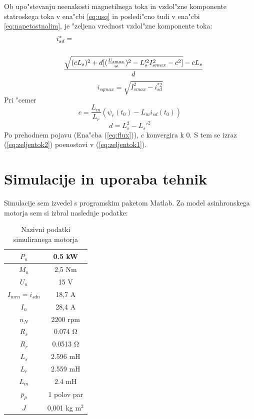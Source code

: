 \documentclass[journal,a4paper,twoside]{sty/IEEEtran}
\begin{document}
Ob upo"stevanju neenakosti magnetilnega toka in vzdol"zne komponente statroskega toka v ena"cbi \ref{eq:usq} in posledi"cno tudi v ena"cbi \ref{eq:napetostnalim}, je "zeljena vrednost vzdol"zne komponente toka:
\begin{equation}
\label{eq:zeljentok2}
\centering
\begin{multlined}
i_{sd}^*= \\ \\
\frac{\sqrt{(c L_s)^2+d[(\frac{U_{smax}}{\omega})^2-L_s'^2I_{smax}^2-c^2]}-cL_s}{d}                 
\end{multlined}
\end{equation}
\begin{equation}
i_{sqmax}=\sqrt{I_{smax}^2-i_{sd}^{*2}}
\end{equation}
Pri "cemer
$$c=\frac{L_m}{L_r}(\psi_{r}(t_0)-L_m i_{sd}(t_0))$$
$$d=L_s^2-L_s'^2$$
Po prehodnem pojavu (Ena"cba (\ref{eq:flux})), $c$ konvergira k 0. S tem se izraz (\ref{eq:zeljentok2}) poenostavi v (\ref{eq:zeljentok1}).\cite{vas}

\section{Simulacije in uporaba tehnik}
Simulacije sem izvedel s programskim paketom Matlab. 
Za model asinhronskega motorja sem si izbral naslednje podatke:
\begin{table}
\centering
\label{tab:nazivni_podatki_motorja}
\caption{Nazivni podatki simuliranega motorja}
\begin{tabular}{|c|c|}
\hline
	$P_n$		&0.5 kW \\\hline
	$M_n$		&2,5 Nm \\\hline
	$U_n$		&	15 V\\\hline
	$I_{mrn}= i_{sdn}$&	18,7 A\\\hline
	$I_n $		&	28,4 A\\\hline
	$n_N $		&	2200 rpm\\\hline
	$R_s$		&	0.074 $\mathrm{\Omega}$\\\hline
	$R_r$		&	0.0513 $\mathrm{\Omega}$\\\hline
	$L_s $		&	2.596 mH\\\hline
	$L_r $		&	2.559 mH\\\hline
	$L_m $		&	2.4 mH\\\hline
	$p_p $		& 	1 polov par	\\\hline
	$J$			&	0,001 kg $\mathrm{m}^2$	\\\hline										
\end{tabular}
\end{table}
\end{document}
